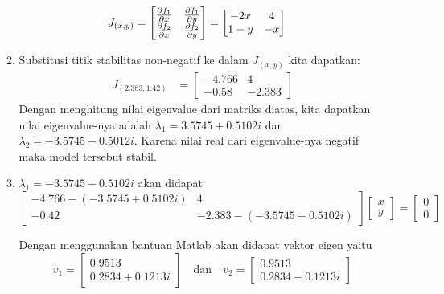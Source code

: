 \documentclass{article}
\begin{document}
\begin{enumerate}
\begin{enumerate}[label=\alph*.]
\begin{align*}
                J_{(x,y)} &= \begin{bmatrix}
                    \pdv{f_1}{x} & \pdv{f_1}{y}\\
                    \pdv{f_2}{x} & \pdv{f_2}{y}
                \end{bmatrix} = \begin{bmatrix}
                    -2x & 4\\
                    1-y & -x
                \end{bmatrix}
            \end{align*}
            \item Substitusi titik stabilitas non-negatif ke dalam $J_{(x,y)}$ kita dapatkan:
            \begin{align*}
                J_{(2.383,1.42)} &= \begin{bmatrix}
                    -4.766 & 4\\
                    -0.58 & -2.383
                \end{bmatrix}
            \end{align*}
            Dengan menghitung nilai eigenvalue dari matriks diatas, kita dapatkan nilai eigenvalue-nya adalah $\lambda_1=3.5745+0.5102i$ dan $\lambda_2=-3.5745-0.5012i$. Karena nilai real dari eigenvalue-nya negatif maka model tersebut stabil.

            \item \(\lambda_1 = -3.5745 + 0.5102i\) akan didapat
    \[
    \begin{bmatrix}
        -4.766 - (-3.5745 + 0.5102i) & 4 \\
        -0.42 & -2.383 - (-3.5745 + 0.5102i)
    \end{bmatrix}
    \begin{bmatrix}
        x \\
        y
    \end{bmatrix}
    = \begin{bmatrix}
        0 \\
        0
    \end{bmatrix}
    \]
    
    Dengan menggunakan bantuan Matlab akan didapat vektor eigen yaitu
    \[
    v_1 = \begin{bmatrix} 0.9513 \\ 0.2834 + 0.1213i \end{bmatrix} \quad \text{dan} \quad v_2 = \begin{bmatrix} 0.9513 \\ 0.2834 - 0.1213i \end{bmatrix}
    \]
    

\end{enumerate}
\end{enumerate}
\end{document}
